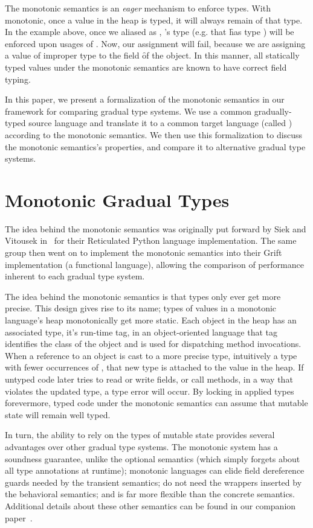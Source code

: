 \documentclass[sigconf]{acmart}
\begin{document}
The monotonic semantics is an \emph{eager} mechanism to enforce types. With
monotonic, once a value in the heap is typed, it will always remain of that
type. In the example above, once we aliased \x as \xp, \xp's type (e.g. that
\f has type ) will be enforced upon usages of \x. Now, our
assignment  will fail, because we are assigning a value
of improper type to the field \f of the object. In this manner, all
statically typed values under the monotonic semantics are known to have
correct field typing.

In this paper, we present a formalization of the monotonic semantics in our
framework for comparing gradual type systems. We use a common
gradually-typed source language and translate it to a common target language
(called \kafka) according to the monotonic semantics. We then use this
formalization to discuss the monotonic semantics's properties, and compare
it to alternative gradual type systems.

\section{Monotonic Gradual Types}

The idea behind the monotonic semantics was originally put forward by Siek
and Vitousek in~\cite{siek14} for their Reticulated Python language
implementation. The same group then went on to implement the monotonic
semantics into their Grift implementation (a functional language), allowing
the comparison of performance inherent to each gradual type system.

The idea behind the monotonic semantics is that types only ever get more
precise. This design gives rise to its name; types of values in a monotonic
language's heap monotonically get more static. Each object in the heap has
an associated type, it's run-time tag, in an object-oriented language that
tag identifies the class of the object and is used for dispatching method
invocations. When a reference to an object is cast to a more precise type,
intuitively a type with fewer occurrences of \any, that new type is attached
to the value in the heap.  If untyped code later tries to read or write
fields, or call methods, in a way that violates the updated type, a type
error will occur. By locking in applied types forevermore, typed code under
the monotonic semantics can assume that mutable state will remain well
typed.

In turn, the ability to rely on the types of mutable state 
provides several advantages over other gradual type systems. The monotonic
system has a soundness guarantee, unlike the optional semantics (which
simply forgets about all type annotations at runtime); monotonic languages
can elide field dereference guards needed by the transient semantics; do not
need the wrappers inserted by the behavioral semantics; and is far more
flexible than the concrete semantics. Additional details about these other
semantics can be found in our companion paper~\cite{us}.
\end{document}
